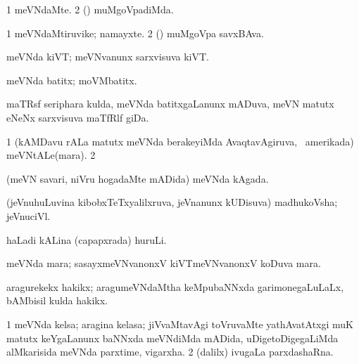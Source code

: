{\bentry
{} 
\gl{\kirxvi}
\expl{}
\bmng
\bnum
\num{1} meVNdaMte. 
\num{2} (\ashi) muMgoVpadiMda. 
\enum
\emng
\eentry

\bentry
{} 
\gl{\nA}
\expl{}
\bmng
\bnum
\num{1} meVNdaMtiruvike; namayxte. 
\num{2} (\ashi) muMgoVpa savxBAva. 
\enum
\emng
\eentry

\bentry
{} 
\gl{\nA}
\expl{}
\bmng
meVNda kiVT; meVNvanunx sarxvisuva kiVT. 
\emng
\eentry

\bentry
{} 
\gl{\nA}
\expl{}
\bmng
meVNda batitx; moVMbatitx. 
\emng
\eentry

\bentry
{} 
\gl{\nA}
\expl{}
\bmng
maTRsf seriphara kulda, meVNda batitxgaLanunx mADuva, meVN matutx eNeNx sarxvisuva maTfRlf giDa. 
\emng
\eentry

\bentry
{} 
\gl{\nA}
\expl{}
\bmng
{} 
\emng
\eentry

\bentry 
{} 
\gl{\nA}
\expl{}
\bmng
\bnum
\num{1} (kAMDavu rALa matutx meVNda berakeyiMda AvaqtavAgiruva, \da\ amerikada) meVNtALe(mara). 
\num{2}  
\enum
\emng
\eentry

\bentry
{} 
\gl{\nA}
\expl{}
\bmng
(meVN savari, niVru hogadaMte mADida) meVNda kAgada. 
\emng
\eentry

\bentry
{} 
\gl{\nA}
\expl{}
\bmng
(jeVnuhuLuvina kibobxTeTxyalilxruva, jeVnanunx kUDisuva) madhukoVsha; jeVnuciVl. 
\emng
\eentry

\bentry
{} 
\gl{\nA}
\expl{}
\bmng
haLadi kALina (capapxrada) huruLi. 
\emng
\eentry

\bentry
{} 
\gl{\nA}
\expl{}
\bmng
meVNda mara; sasayxmeVNvanonxV kiVTmeVNvanonxV koDuva mara. 
\emng
\eentry

\bentry
{} 
\gl{\nA}
\expl{}
\bmng
aragurekekx hakikx; aragumeVNdaMtha keMpubaNNxda garimonegaLuLaLx, bAMbisil kulda hakikx. 
\emng
\eentry

\bentry
{} 
\gl{\nA}
\expl{}
\bmng
\bnum
\num{1} meVNda kelsa; aragina kelasa; jiVvaMtavAgi toVruvaMte yathAvatAtxgi muK matutx keYgaLanunx baNNxda meVNdiMda mADida, uDigetoDigegaLiMda alMkarisida meVNda parxtime, vigarxha. 
\num{2} (\bava dalilx) ivugaLa parxdashaRna. 
\enum
\emng
\eentry

}
